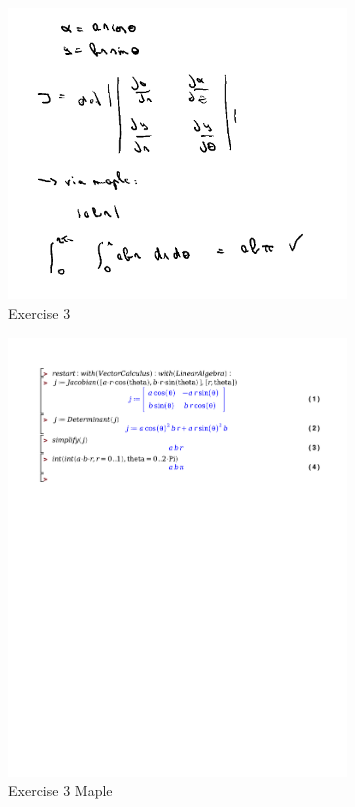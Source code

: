 \documentclass[a4paper]{report}
\begin{document}
\begin{figure}[H]
	\centering
	\includegraphics[width=0.8\textwidth]{assets/wc_5_ex_3.png}
	\caption{Exercise 3}
	\label{fig:wc_5_ex_3}
\end{figure}

\begin{figure}[H]
	\centering
	\includegraphics[width=0.8\textwidth]{exercises/wc_5_ex_3.pdf}
	\caption{Exercise 3 Maple}
	\label{fig:wc_5_ex_3_maple}
\end{figure}
\end{document}
